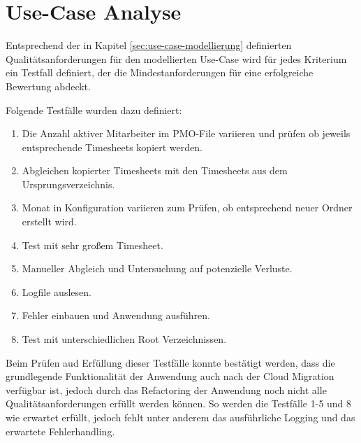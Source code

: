 \section{Use-Case Analyse}
Entsprechend der in Kapitel \ref{sec:use-case-modellierung} definierten Qualitätsanforderungen für den modellierten Use-Case wird für jedes Kriterium ein Testfall definiert, der die Mindestanforderungen für eine erfolgreiche Bewertung abdeckt.

Folgende Testfälle wurden dazu definiert:
\begin{enumerate}
    \item Die Anzahl aktiver Mitarbeiter im PMO-File variieren und prüfen ob jeweils entsprechende Timesheets kopiert werden.
    \item Abgleichen kopierter Timesheets mit den Timesheets aus dem Ursprungsverzeichnis.
    \item Monat in Konfiguration variieren zum Prüfen, ob entsprechend neuer Ordner erstellt wird.
    \item Test mit sehr großem Timesheet.
    \item Manueller Abgleich und Untersuchung auf potenzielle Verluste.
    \item Logfile auslesen.
    \item Fehler einbauen und Anwendung ausführen.
    \item Test mit unterschiedlichen Root Verzeichnissen.
\end{enumerate}

Beim Prüfen aud Erfüllung dieser Testfälle konnte bestätigt werden, dass die grundlegende Funktionalität der Anwendung auch nach der Cloud Migration verfügbar ist, jedoch durch das Refactoring der Anwendung noch nicht alle Qualitätsanforderungen erfüllt werden können. So werden die Testfälle 1-5 und 8 wie erwartet erfüllt, jedoch fehlt unter anderem das ausführliche Logging und das erwartete Fehlerhandling.